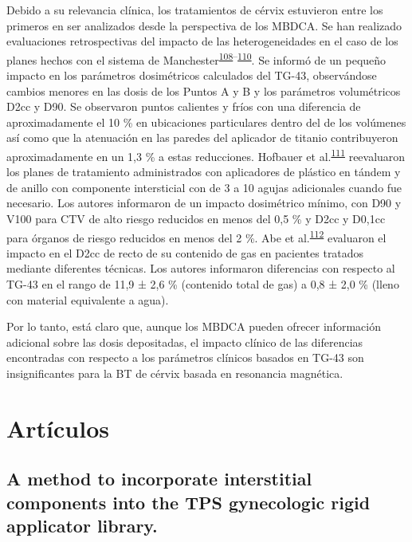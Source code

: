\documentclass[
  a4paper,
]{scrreprt}
\begin{document}
Debido a su relevancia clínica, los tratamientos de cérvix estuvieron
entre los primeros en ser analizados desde la perspectiva de los MBDCA.
Se han realizado evaluaciones retrospectivas del impacto de las
heterogeneidades en el caso de los planes hechos con el sistema de
Manchester\textsuperscript{\protect\hyperlink{ref-mikell2012}{108}--\protect\hyperlink{ref-sinnatamby2016}{110}}.
Se informó de un pequeño impacto en los parámetros dosimétricos
calculados del TG-43, observándose cambios menores en las dosis de los
Puntos A y B y los parámetros volumétricos D2cc y D90. Se observaron
puntos calientes y fríos con una diferencia de aproximadamente el 10 \%
en ubicaciones particulares dentro del de los volúmenes así como que la
atenuación en las paredes del aplicador de titanio contribuyeron
aproximadamente en un 1,3 \% a estas reducciones. Hofbauer et
al.\textsuperscript{\protect\hyperlink{ref-hofbauer2016}{111}}
reevaluaron los planes de tratamiento administrados con aplicadores de
plástico en tándem y de anillo con componente intersticial con de 3 a 10
agujas adicionales cuando fue necesario. Los autores informaron de un
impacto dosimétrico mínimo, con D90 y V100 para CTV de alto riesgo
reducidos en menos del 0,5 \% y D2cc y D0,1cc para órganos de riesgo
reducidos en menos del 2 \%. Abe et
al.\textsuperscript{\protect\hyperlink{ref-abe2018}{112}} evaluaron el
impacto en el D2cc de recto de su contenido de gas en pacientes tratados
mediante diferentes técnicas. Los autores informaron diferencias con
respecto al TG-43 en el rango de 11,9 ± 2,6 \% (contenido total de gas)
a 0,8 ± 2,0 \% (lleno con material equivalente a agua).

Por lo tanto, está claro que, aunque los MBDCA pueden ofrecer
información adicional sobre las dosis depositadas, el impacto clínico de
las diferencias encontradas con respecto a los parámetros clínicos
basados en TG-43 son insignificantes para la BT de cérvix basada en
resonancia magnética.


\hypertarget{artuxedculos}{%
\chapter{Artículos}\label{artuxedculos}}

\newpage{}

\hypertarget{a-method-to-incorporate-interstitial-components-into-the-tps-gynecologic-rigid-applicator-library.}{%
\section{A method to incorporate interstitial components into the TPS
gynecologic rigid applicator
library.}\label{a-method-to-incorporate-interstitial-components-into-the-tps-gynecologic-rigid-applicator-library.}}
\end{document}
